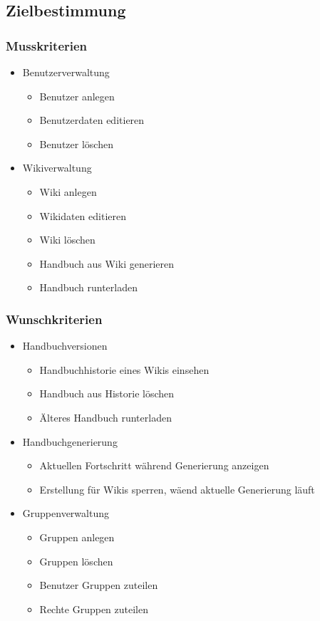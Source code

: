\label{app:lastenehft}

\subsection*{Zielbestimmung}

	\subsubsection*{Musskriterien}
		\begin{itemize}
			\item Benutzerverwaltung
			\begin{itemize}
				\item Benutzer anlegen
				\item Benutzerdaten editieren
				\item Benutzer löschen
			\end{itemize}
			\item Wikiverwaltung
			\begin{itemize}
				\item Wiki anlegen
				\item Wikidaten editieren
				\item Wiki löschen
				\item Handbuch aus Wiki generieren
				\item Handbuch runterladen
			\end{itemize}
		\end{itemize}

	\subsubsection*{Wunschkriterien}
		\begin{itemize}
			\item Handbuchversionen
			\begin{itemize}
				\item Handbuchhistorie eines Wikis einsehen
				\item Handbuch aus Historie löschen
				\item Älteres Handbuch runterladen
			\end{itemize}
			\item Handbuchgenerierung
			\begin{itemize}
				\item Aktuellen Fortschritt während Generierung anzeigen
				\item Erstellung für Wikis sperren, wäend aktuelle Generierung läuft
			\end{itemize}
			\item Gruppenverwaltung
			\begin{itemize}
				\item Gruppen anlegen
				\item Gruppen löschen
				\item Benutzer Gruppen zuteilen
				\item Rechte Gruppen zuteilen
			\end{itemize}
		\end{itemize}

